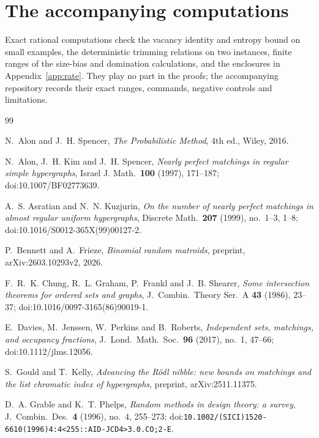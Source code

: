 \documentclass[11pt,a4paper]{amsart}
\theoremstyle{plain}
\theoremstyle{definition}
\theoremstyle{remark}
\begin{document}
\section{The accompanying computations}
\label{app:computations}

Exact rational computations check the vacancy identity and entropy bound on small
examples, the deterministic trimming relations on two instances, finite ranges of the
size-bias and domination calculations, and the enclosures in Appendix~\ref{app:rate}.
They play no part in the proofs; the accompanying repository records their exact ranges,
commands, negative controls and limitations.

\begin{thebibliography}{99}

N.~Alon and J.~H. Spencer,
\emph{The Probabilistic Method},
4th ed., Wiley, 2016.

N.~Alon, J.~H. Kim and J.~H. Spencer,
\emph{Nearly perfect matchings in regular simple hypergraphs},
Israel J. Math.\ \textbf{100} (1997), 171--187;
doi:10.1007/BF02773639.

A.~S. Asratian and N.~N. Kuzjurin,
\emph{On the number of nearly perfect matchings in almost regular uniform hypergraphs},
Discrete Math.\ \textbf{207} (1999), no.~1--3, 1--8;
doi:10.1016/S0012-365X(99)00127-2.

P.~Bennett and A.~Frieze,
\emph{Binomial random matroids},
preprint, arXiv:2603.10293v2, 2026.

F.~R.~K. Chung, R.~L. Graham, P.~Frankl and J.~B. Shearer,
\emph{Some intersection theorems for ordered sets and graphs},
J.\ Combin.\ Theory Ser.\ A \textbf{43} (1986), 23--37;
doi:10.1016/0097-3165(86)90019-1.

E.~Davies, M.~Jenssen, W.~Perkins and B.~Roberts,
\emph{Independent sets, matchings, and occupancy fractions},
J.\ Lond.\ Math.\ Soc.\ \textbf{96} (2017), no.~1, 47--66;
doi:10.1112/jlms.12056.

S.~Gould and T.~Kelly,
\emph{Advancing the R\"odl nibble: new bounds on matchings and the list chromatic index
of hypergraphs},
preprint, arXiv:2511.11375.

D.~A. Grable and K.~T. Phelps,
\emph{Random methods in design theory: a survey},
J.\ Combin.\ Des.\ \textbf{4} (1996), no.~4, 255--273;
doi:\nolinkurl{10.1002/(SICI)1520-6610(1996)4:4<255::AID-JCD4>3.0.CO;2-E}.


\end{thebibliography}
\end{document}
